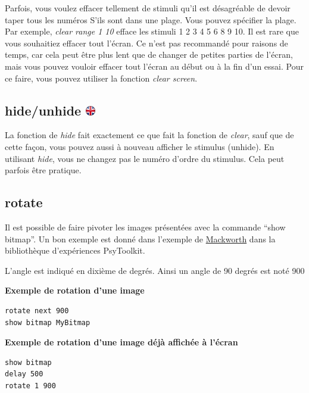 \documentclass[
]{book}
\begin{document}
Parfois, vous voulez effacer tellement de stimuli qu'il est désagréable de devoir taper tous les numéros S'ils sont dans une plage. Vous pouvez spécifier la plage. Par exemple, \emph{clear range 1 10} efface les stimuli 1 2 3 4 5 6 8 9 10.
Il est rare que vous souhaitiez effacer tout l'écran. Ce n'est pas recommandé pour raisons de temps, car cela peut être plus lent que de changer de petites parties de l'écran, mais vous pouvez vouloir effacer tout l'écran au début ou à la fin d'un essai. Pour ce faire, vous pouvez utiliser la fonction \emph{clear screen}.

\hypertarget{hideunhide}{%
\subsection[hide/unhide ]{\texorpdfstring{hide/unhide \href{https://www.psytoolkit.org/doc3.4.0/syntax.html\#task-hide}{\protect\includegraphics{img/ukflag.png}}}{hide/unhide }}\label{hideunhide}}

La fonction de \emph{hide} fait exactement ce que fait la fonction de \emph{clear}, sauf que de cette façon, vous pouvez aussi à nouveau afficher le stimulus (unhide). En utilisant \emph{hide}, vous ne changez pas le numéro d'ordre du stimulus. Cela peut parfois être pratique.

\hypertarget{rotate}{%
\subsection{rotate}\label{rotate}}

Il est possible de faire pivoter les images présentées avec la commande ``show bitmap''. Un bon exemple est donné dans l'exemple de \href{http://www.psytoolkit.org/experiment-library/mackworth.html}{Mackworth} dans la bibliothèque d'expériences PsyToolkit.

L'angle est indiqué en dixième de degrés. Ainsi un angle de 90 degrés est noté 900

\textbf{Exemple de rotation d'une image}

\begin{verbatim}
rotate next 900
show bitmap MyBitmap
\end{verbatim}

\textbf{Exemple de rotation d'une image déjà affichée à l'écran}

\begin{verbatim}
show bitmap
delay 500
rotate 1 900
\end{verbatim}
\end{document}
